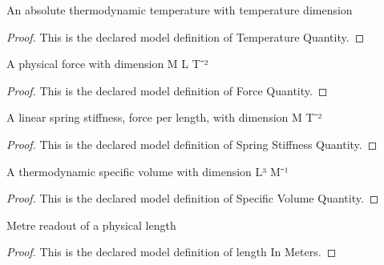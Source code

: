 \begin{definition}
  \label{def:physics:phyx-mini-0446:phyxminiproblems-problemphyxmini0446-temperaturequantity}
  An absolute thermodynamic temperature with temperature dimension
\end{definition}
\begin{proof}
  This is the declared model definition of Temperature Quantity.
\end{proof}
\begin{definition}
  \label{def:physics:phyx-mini-0446:phyxminiproblems-problemphyxmini0446-forcequantity}
  A physical force with dimension M L T⁻²
\end{definition}
\begin{proof}
  This is the declared model definition of Force Quantity.
\end{proof}
\begin{definition}
  \label{def:physics:phyx-mini-0446:phyxminiproblems-problemphyxmini0446-springstiffnessquantity}
  A linear spring stiffness, force per length, with dimension M T⁻²
\end{definition}
\begin{proof}
  This is the declared model definition of Spring Stiffness Quantity.
\end{proof}
\begin{definition}
  \label{def:physics:phyx-mini-0446:phyxminiproblems-problemphyxmini0446-specificvolumequantity}
  A thermodynamic specific volume with dimension L³ M⁻¹
\end{definition}
\begin{proof}
  This is the declared model definition of Specific Volume Quantity.
\end{proof}
\begin{definition}
  \label{def:physics:phyx-mini-0446:phyxminiproblems-problemphyxmini0446-lengthinmeters}
  Metre readout of a physical length
\end{definition}
\begin{proof}
  This is the declared model definition of length In Meters.
\end{proof}
